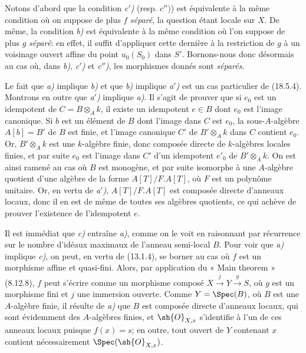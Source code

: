 Notons d'abord que la condition \emph{c$'$)} (resp. $c'')$) est équivalente à la même condition où on suppose de plus $f$ \emph{séparé}, la question étant locale sur $X$. De même, la condition \emph{b)} est équivalente à la même condition où l'on suppose de plus $g$ \emph{séparé}: en effet, il suffit d'appliquer cette dernière à la restriction de $g$ à un voisinage ouvert affine du point $u_0(S_0)$ dans $S'$. Bornons-nous donc désormais au cas où, dans \emph{b)}, \emph{c$'$)} et \emph{c$''$)}, les morphismes donnés sont \emph{séparés}.

Le fait que \emph{a)} implique \emph{b)} et que \emph{b)} implique \emph{a$'$)} est un cas particulier de (18.5.4). Montrons en outre que \emph{a$'$)} implique \emph{a)}. Il s'agit de prouver que si $e_0$ est un idempotent de $C=B\otimes_A k$, il existe un idempotent $e\in B$ dont $e_0$ est l'image canonique. Si $b$ est un élément de $B$ dont l'image dans $C$ est $e_0$, la sous-$A$-algèbre $A[b]=B'$ de $B$ est finie, et l'image canonique $C'$ de $B'\otimes_A k$ dans $C$ contient $e_0$. Or, $B'\otimes_A k$ est une $k$-algèbre finie, donc composée directe de $k$-algèbres locales finies, et par suite $e_0$ est l'image dans $C'$ d'un idempotent $e'_0$ de $B'\otimes_A k$. On est ainsi ramené au cas où $B$ est monogène, et par suite isomorphe à une $A$-algèbre quotient d'une algèbre de la forme $A[T]/F.A[T]$, où $F$ est un polynôme unitaire. Or, en vertu de \emph{a$'$)}, $A[T]/F.A[T]$ est composée directe d'anneaux locaux, donc il en est de même de toutes ses algèbres quotients, ce qui achève de prouver l'existence de l'idempotent $e$.

Il est immédiat que \emph{c)} entraîne \emph{a)}, comme on le voit en raisonnant par récurrence sur le nombre d'idéaux maximaux de l'anneau semi-local $B$. Pour voir que \emph{a)} implique \emph{c)}, on peut, en vertu de (13.1.4), se borner au cas où $f$ est un morphisme affine et quasi-fini. Alors, par application du « Main theorem » (8.12.8), $f$ peut s'écrire comme un morphisme composé $X\xrightarrow{j}Y\xrightarrow{g}S$, où $g$ est un morphisme fini et $j$ une immersion ouverte. Comme $Y=\Spec(B)$, où $B$ est une $A$-algèbre finie, il résulte de \emph{a)} que $B$ est composée directe d'anneaux locaux, qui sont évidemment des $A$-algèbres finies, et $\sh{O}_{X,x}$ s'identifie à l'un de ces anneaux locaux puisque $f(x)=s$; en outre, tout ouvert de $Y$ contenant $x$ contient nécessairement $\Spec(\sh{O}_{X,x})$.


